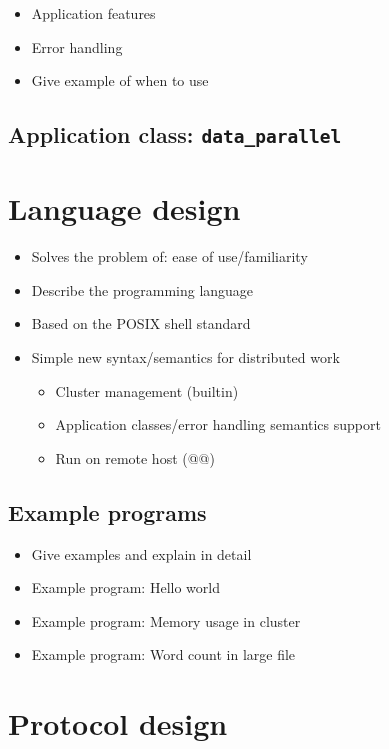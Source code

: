 \documentclass[twoside]{report}
\begin{document}
\begin{itemize}
  \item Application features 
  \item Error handling
  \item Give example of when to use
\end{itemize}

\subsection{Application class: \texttt{data\_parallel}}

\section{Language design}

\begin{itemize}
  \item Solves the problem of: ease of use/familiarity
  \item Describe the programming language
  \item Based on the POSIX shell standard
  \item Simple new syntax/semantics for distributed work
  \begin{itemize}
    \item Cluster management (builtin)
    \item Application classes/error handling semantics support
    \item Run on remote host (@@) 
  \end{itemize}
\end{itemize}

\subsection{Example programs}

\begin{itemize}
  \item Give examples and explain in detail
  \item Example program: Hello world
  \item Example program: Memory usage in cluster
  \item Example program: Word count in large file
\end{itemize}

\section{Protocol design}
\end{document}
